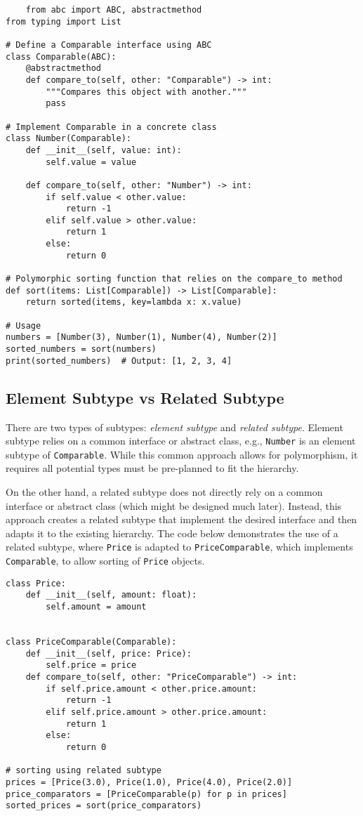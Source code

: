 \documentclass[oneside,11pt,dvipsnames]{book}
\newcommand{\code}[1]{\texttt{#1}}
\begin{document}
\begin{lstlisting}
    from abc import ABC, abstractmethod
from typing import List

# Define a Comparable interface using ABC
class Comparable(ABC):
    @abstractmethod
    def compare_to(self, other: "Comparable") -> int:
        """Compares this object with another."""
        pass

# Implement Comparable in a concrete class
class Number(Comparable):
    def __init__(self, value: int):
        self.value = value

    def compare_to(self, other: "Number") -> int:
        if self.value < other.value:
            return -1
        elif self.value > other.value:
            return 1
        else:
            return 0

# Polymorphic sorting function that relies on the compare_to method
def sort(items: List[Comparable]) -> List[Comparable]:
    return sorted(items, key=lambda x: x.value)

# Usage
numbers = [Number(3), Number(1), Number(4), Number(2)]
sorted_numbers = sort(numbers)
print(sorted_numbers)  # Output: [1, 2, 3, 4]
\end{lstlisting}    

\subsection{Element Subtype vs Related Subtype} There are two types of subtypes: \emph{element subtype} and \emph{related subtype}. Element subtype relies on a common interface or abstract class, e.g., \code{Number} is an element subtype of \code{Comparable}. While this common approach allows for polymorphism, it requires all potential types must be pre-planned to fit the hierarchy. 

On the other hand, a related subtype does not directly rely on a common interface or abstract class (which might be designed much later). Instead, this approach creates a related subtype that implement the desired interface and then adapts it to the existing hierarchy. The code below demonstrates the use of a related subtype, where \code{Price} is adapted to \code{PriceComparable}, which implements \code{Comparable}, to allow sorting of \code{Price} objects.

\begin{lstlisting}
class Price:
    def __init__(self, amount: float):
        self.amount = amount


class PriceComparable(Comparable):
    def __init__(self, price: Price):
        self.price = price
    def compare_to(self, other: "PriceComparable") -> int:
        if self.price.amount < other.price.amount:
            return -1
        elif self.price.amount > other.price.amount:
            return 1
        else:
            return 0

# sorting using related subtype            
prices = [Price(3.0), Price(1.0), Price(4.0), Price(2.0)]
price_comparators = [PriceComparable(p) for p in prices]
sorted_prices = sort(price_comparators)
\end{lstlisting}
\end{document}

